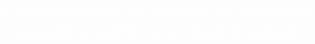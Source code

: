 \pagecolor{white}
\pagestyle{eimat}
\begin{titlepage}
\pagecolor{white}
\newcommand{\R}{\ensuremath{\mathbb{R}}}
\BgThispage
{}
\vspace*{-1.1cm}
\noindent
\def\titulo#1{\section{#1}}

\section{\bf\large\textcolor{white}{Comparaci\'on de las escuelas de educaci\'on matem\'atica realista y socioepistemolog\'ia}}
\vspace*{2cm}\par
\noindent


\end{titlepage}
